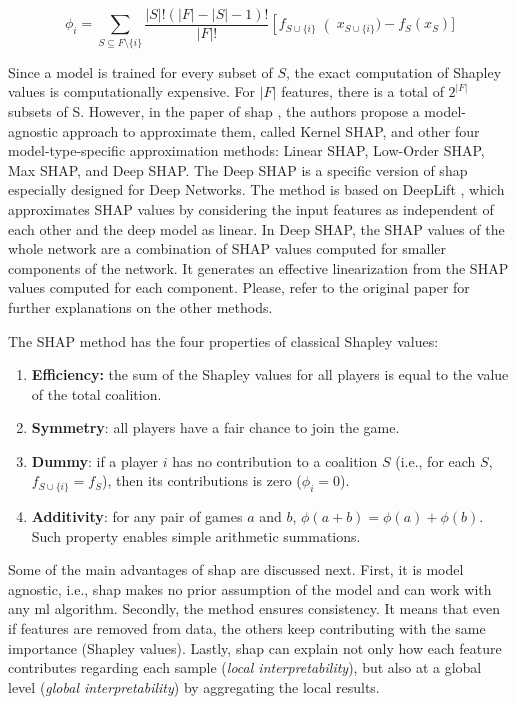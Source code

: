 \begin{equation}
\label{eq:shapley-values}
\phi_i = \sum_{S \subseteq F \setminus \{i\}} \frac{\left|S\right|!(\left|F\right| - \left|S\right| - 1)!}{\left|F\right|!}\left[f_{S \cup \{i\}}\right (x_{S \cup \{i\}}) - f_S(x_S)]
\end{equation}

Since a model is trained for every subset of $S$, the exact computation of Shapley values is computationally expensive. For $\left|F\right|$ features, there is a total of $2^{\left|F\right|}$ subsets of S. However, in the paper of \acs{shap} \citep{shap2018}, the authors propose a model-agnostic approach to approximate them, called Kernel SHAP, and other four model-type-specific approximation methods: Linear SHAP, Low-Order SHAP, Max SHAP, and Deep SHAP. The Deep SHAP is a specific version of \acs{shap} especially designed for Deep Networks. The method is based on DeepLift \citep{deeplift_old, deeplift_new}, which approximates SHAP values by considering the input features as independent of each other and the deep model as linear. In Deep SHAP, the SHAP values of the whole network are a combination of SHAP values computed for smaller components of the network. It generates an effective linearization from the SHAP values computed for each component. Please, refer to the original paper for further explanations on the other methods.

The SHAP method has the four properties of classical Shapley values:

\begin{enumerate}
\item \textbf{Efficiency:} the sum of the Shapley values for all players is equal to the value of the total coalition. 
\item \textbf{Symmetry}: all players have a fair chance to join the game.
\item \textbf{Dummy}: if a player $i$ has no contribution to a coalition $S$ (i.e., for each $S$, $f_{S \cup \{i\}} = f_S$), then its contributions is zero ($\phi_i = 0$).
\item \textbf{Additivity}: for any pair of games $a$ and $b$, $\phi(a + b) = \phi(a) + \phi(b)$. Such property enables simple arithmetic summations.
\end{enumerate}

Some of the main advantages of \acs{shap} are discussed next. First, it is model agnostic, i.e., \acs{shap} makes no prior assumption of the model and can work with any \acs{ml} algorithm. Secondly, the method ensures consistency. It means that even if features are removed from data, the others keep contributing with the same importance (Shapley values). Lastly, \acs{shap} can explain not only how each feature contributes regarding each sample (\textit{local interpretability}), but also at a global level (\textit{global interpretability}) by aggregating the local results.

